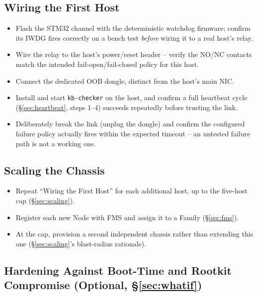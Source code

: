 \documentclass[11pt,a4paper]{article}
\begin{document}
\subsection{Wiring the First Host}

\begin{itemize}[label=$\square$]
  \item Flash the STM32 channel with the deterministic watchdog
    firmware; confirm its IWDG fires correctly on a bench test
    \emph{before} wiring it to a real host's relay.
  \item Wire the relay to the host's power/reset header -- verify the
    NO/NC contacts match the intended fail-open/fail-closed policy for
    this host.
  \item Connect the dedicated OOB dongle, distinct from the host's main
    NIC.
  \item Install and start \texttt{kb-checker} on the host, and confirm
    a full heartbeat cycle (\S\ref{sec:heartbeat}, steps 1--4) succeeds
    repeatedly before trusting the link.
  \item Deliberately break the link (unplug the dongle) and confirm the
    configured failure policy actually fires within the expected
    timeout -- an untested failure path is not a working one.
\end{itemize}

\subsection{Scaling the Chassis}

\begin{itemize}[label=$\square$]
  \item Repeat ``Wiring the First Host'' for each additional host, up
    to the five-host cap (\S\ref{sec:scaling}).
  \item Register each new Node with FMS and assign it to a Family
    (\S\ref{sec:fms}).
  \item At the cap, provision a second independent chassis rather than
    extending this one (\S\ref{sec:scaling}'s blast-radius rationale).
\end{itemize}

\subsection{Hardening Against Boot-Time and Rootkit Compromise (Optional, \S\ref{sec:whatif})}
\end{document}
